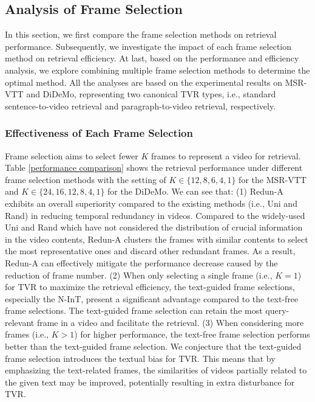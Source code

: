 \documentclass[11pt]{article}
\begin{document}
\subsection{Analysis of Frame Selection}  

In this section, we first compare the frame selection methods on retrieval performance.
Subsequently, we investigate the impact of each frame selection method on retrieval efficiency.
At last, based on the performance and efficiency analysis, we explore combining multiple frame selection methods to determine the optimal method.
All the analyses are based on the experimental results on MSR-VTT and DiDeMo, representing two canonical TVR types, i.e., standard sentence-to-video retrieval and paragraph-to-video retrieval, respectively.

\subsubsection{Effectiveness of Each Frame Selection}
 \label{effectiveness}
Frame selection aims to select fewer $K$ frames to represent a video for retrieval.
Table \ref{performance comparison} shows the retrieval performance under different frame selection methods with the setting of $K\in\{12, 8, 6, 4, 1\}$ for the MSR-VTT and $K\in\{24, 16, 12, 8, 4, 1\}$ for the DiDeMo.
We can see that:
(1) Redun-A exhibits an overall superiority compared to the existing methods (i.e., Uni and Rand) in reducing temporal redundancy in videos.
Compared to the widely-used Uni and Rand which have not considered the distribution of crucial information in the video contents, Redun-A clusters the frames with similar contents to select the most representative ones and discard other redundant frames.
As a result, Redun-A can effectively mitigate the performance decrease caused by the reduction of frame number.
(2) When only selecting a single frame (i.e., $K = 1$) for TVR to maximize the retrieval efficiency, the text-guided frame selections, especially the N-InT, present a significant advantage compared to the text-free frame selections.
The text-guided frame selection can retain the most query-relevant frame in a video and facilitate the retrieval.
(3) When considering more frames (i.e., $K > 1$) for higher performance, the text-free frame selection performs better than the text-guided frame selection.
We conjecture that the text-guided frame selection introduces the textual bias for TVR.
This means that by emphasizing the text-related frames, the similarities of videos partially related to the given text may be improved, potentially resulting in extra disturbance for TVR.
\end{document}
